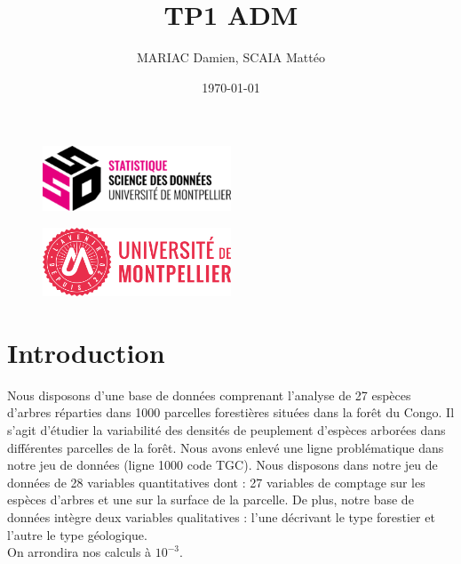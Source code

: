 \documentclass{article}
\title{TP1 ADM}
\author{MARIAC Damien, SCAIA Mattéo}
\date{\today}
\begin{document}
\maketitle

\begin{figure}[h] 
    \centering
    \includegraphics[width=0.5\textwidth]{ssd_logo.png} 
\end{figure}

\begin{figure}[h] 
    \centering
    \includegraphics[width=0.5\textwidth]{logo_um_2022_rouge_RVB.png} 
\end{figure}

\newpage

\tableofcontents

\newpage

\section{Introduction}
Nous disposons d'une base de données comprenant l'analyse de 27 espèces d'arbres réparties dans 1000 parcelles forestières situées dans la forêt du Congo.
Il s'agit d'étudier la variabilité des densités de peuplement d'espèces arborées dans différentes parcelles de la forêt.  Nous avons enlevé une ligne problématique dans notre jeu de données (ligne 1000 code TGC).
Nous disposons dans notre jeu de données de 28 variables quantitatives dont : 27 variables de comptage sur les espèces d'arbres et une sur la surface de la parcelle. De plus, notre base de données intègre deux variables qualitatives : l'une décrivant le type forestier et l'autre le type géologique.
\\
On arrondira nos calculs à $10^{-3}$.
\end{document}
